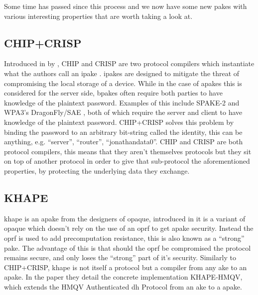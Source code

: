 Some time has passed since this process and we now have some new \glspl{pake} with various interesting properties that are worth taking a look at.

\clearpage

\subsection{CHIP+CRISP}
Introduced in \citeyear{chip+crisp} by \citeauthor{chip+crisp}, CHIP and CRISP are two protocol compilers which instantiate what the authors call an \gls{ipake} \cite{chip+crisp}.
\glspl{ipake} are designed to mitigate the threat of compromising the local storage of a device.
While in the case of \glspl{apake} this is considered for the server side, \glspl{bpake} often require both parties to have knowledge of the plaintext password.
Examples of this include SPAKE-2 \cite{spake} and WPA3's DragonFly/SAE \cite{sae}, both of which require the server and client to have knowledge of the plaintext password.
CHIP+CRISP solves this problem by binding the password to an arbitrary bit-string called the identity, this can be anything, e.g. \enquote{server}, \enquote{router}, \enquote{jonathandata0}.
CHIP and CRISP are both protocol compilers, this means that they aren't themselves protocols but they sit on top of another protocol in order to give that sub-protocol the aforementioned properties, by protecting the underlying data they exchange.

\subsection{KHAPE}
\gls{khape} \cite{khape} is an \gls{apake} from the designers of \gls{opaque}, introduced in \citeyear{khape} it is a variant of \gls{opaque} which doesn't rely on the use of an \gls{oprf} to get \gls{apake} security.
Instead the \gls{oprf} is used to add precomputation resistance, this is also known as a \enquote{strong} \gls{pake}.
The advantage of this is that should the \gls{oprf} be compromised the protocol remains secure, and only loses the \enquote{strong} part of it's security.
Similarly to CHIP+CRISP, \gls{khape} is not itself a protocol but a compiler from any \gls{ake} to an \gls{apake}.
In the paper they detail the concrete implementation KHAPE-HMQV, which extends the HMQV Authenticated \gls{dh} Protocol from an \gls{ake} to a \gls{apake}.

